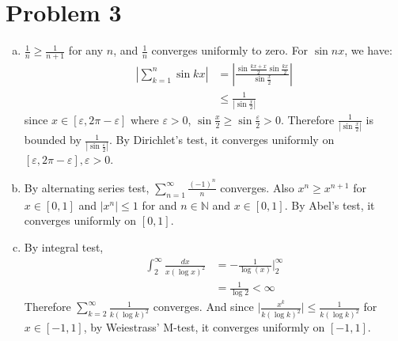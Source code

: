 \documentclass{report}
\def\ve{\varepsilon}
\begin{document}
    \section*{Problem 3}
    \begin{enumerate}[(a)]
        \item 
        $\frac{1}{n} \ge \frac{1}{n+1}$ for any $n$, and 
        $\frac{1}{n}$ converges uniformly to zero. For $\sin nx$, we have:
        \begin{align*}
            \left| \sum_{k=1}^n \sin kx \right| &= \left| \frac{\sin\frac{kx+x}{2}
            \sin\frac{kx}{2}}{\sin\frac{x}{2}} \right| \\
            &\le\frac{1}{\left|\sin\frac{x}{2} \right|}
        \end{align*}
        since $x \in [\ve, 2\pi - \ve]$ where $\ve > 0$, $\sin \frac{x}{2} \ge \sin
        \frac{\ve}{2} > 0$. Therefore $\frac{1}{\left|\sin\frac{x}{2} \right|}$ is bounded
        by $\frac{1}{\left|\sin\frac{\ve}{2} \right|}$. By Dirichlet's test, it converges
        uniformly on $[\ve, 2\pi - \ve], \ve > 0$.
        \item 
        By alternating series test, $\sum_{n=1}^\infty \frac{{(-1)}^n}{n}$ converges.
        Also $x^n \ge x^{n+1}$ for $x \in [0,1]$ and $|x^n| \le 1$ for and $n\in\mathbb{N}
        $ and $x \in [0, 1]$. By Abel's test, it converges uniformly on $[0, 1]$.
        \item 
        By integral test, 
        \begin{align*}
            \int_2^\infty \frac{dx}{x {(\log x)}^2} &= -\frac{1}{\log(x)} \bigg|_2^\infty \\
            &= \frac{1}{\log 2} < \infty
        \end{align*}
        Therefore $\sum_{k=2}^\infty \frac{1}{k{(\log k)}^2}$ converges.
        And since $\bigg|\frac{x^k}{k{(\log k)}^2}\bigg| \le \frac{1}{k{(\log k)}^2}$ for 
        $x \in [-1, 1]$, by Weiestrass' M-test, it converges uniformly on $[-1, 1]$.
    \end{enumerate}
\end{document}
